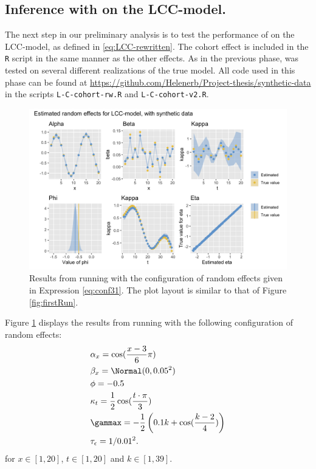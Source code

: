 \subsection{Inference with \inlabru on the LCC-model. }
The next step in our preliminary analysis is to test the performance of \inlabru on the LCC-model, as defined in \ref{eq:LCC-rewritten}. The cohort effect is included in the \texttt{R} script in the same manner as the other effects. As in the previous phase, \inlabru was tested on several different realizations of the true model. All code used in this phase can be found at \url{https://github.com/Helenerb/Project-thesis/synthetic-data} in the scripts \texttt{L-C-cohort-rw.R} and \texttt{L-C-cohort-v2.R}.
\begin{figure}[h!]
    \centering
    \includegraphics[width=0.85\linewidth]{synthetic-data/Figures/effects-LCC-synthetic-3-1.png}
    \caption{Results from running \inlabru with the configuration of random effects given in Expression \ref{eq:conf31}. The plot layout is similar to that of Figure \ref{fig:firstRun}.}
    \label{fig:conf31}
\end{figure}
Figure \ref{fig:conf31} displays the results from running \inlabru with the following configuration of random effects:
\begin{equation}
    \begin{aligned}
        &\alpha_x = \cos(\frac{x-3}{6}\pi)\\
        &\beta_x = \Normal(0,0.05^2)\\
        &\phi = -0.5\\
        &\kappa_t = \frac{1}{2}\cos(\frac{t\cdot \pi}{3})\\
        &\gammax = -\frac{1}{2}\left( 0.1k + \cos(\frac{k-2}{4})\right)\\
        &\tau_{\epsilon} = 1/0.01^2.
    \end{aligned}
    \label{eq:conf31}
\end{equation}
for $x\in[1,20]$, $t \in [1,20]$ and $k \in [1,39]$. 

